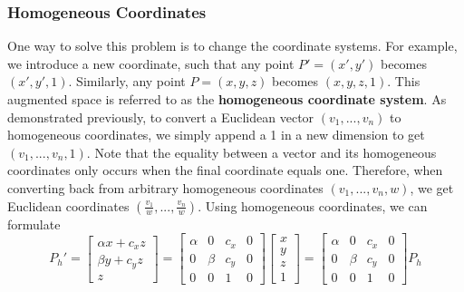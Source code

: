 \documentclass[a4paper, 12pt]{article}
\renewcommand\emph{\textbf}
\begin{document}
\subsubsection{Homogeneous Coordinates}

One way to solve this problem is to change the coordinate systems. For example, we introduce a new coordinate, such that any point $P' =(x',y')$ becomes $(x',y',1)$. Similarly, any point $P =(x,y,z)$ becomes $(x,y,z,1)$. This augmented space is referred to as the \emph{homogeneous coordinate system}. As demonstrated previously, to convert a Euclidean vector $(v_1,...,v_n)$ to homogeneous coordinates, we simply append a 1 in a new dimension to get $(v_1,...,v_n,1)$. Note that the equality between a vector and its homogeneous coordinates only occurs when the final coordinate equals one. Therefore, when converting back from arbitrary homogeneous coordinates $(v_1,  ... , v_n , w)$, we get Euclidean coordinates $(\frac{v_1}{w},...,\frac{v_n}{w})$. Using homogeneous coordinates, we can formulate
\begin{equation}
    P_h' = \begin{bmatrix}\alpha x + c_xz\\\beta y + c_yz \\ z\end{bmatrix} = 
    \begin{bmatrix}
    \alpha & 0 & c_x & 0\\
    0 & \beta & c_y & 0 \\ 
    0 & 0 & 1 & 0
    \end{bmatrix}
    \begin{bmatrix}x\\y\\z\\1\end{bmatrix} =     \begin{bmatrix}
    \alpha & 0 & c_x & 0\\
    0 & \beta & c_y & 0 \\ 
    0 & 0 & 1 & 0
    \end{bmatrix} P_h
    \label{eq:homogeneous}
\end{equation}
\end{document}
